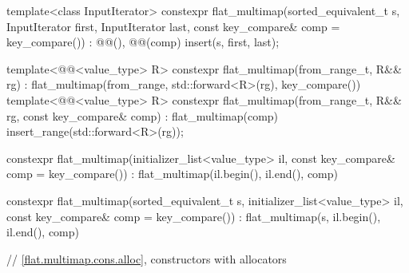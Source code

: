 \begin{codeblock}
{{    template<class InputIterator>
      constexpr flat_multimap(sorted_equivalent_t s, InputIterator first, InputIterator last,
                              const key_compare& comp = key_compare())
        : @@(), @@(comp) { insert(s, first, last); }

    template<@@<value_type> R>
      constexpr flat_multimap(from_range_t, R&& rg)
        : flat_multimap(from_range, std::forward<R>(rg), key_compare()) { }
    template<@@<value_type> R>
      constexpr flat_multimap(from_range_t, R&& rg, const key_compare& comp)
        : flat_multimap(comp) { insert_range(std::forward<R>(rg)); }

    constexpr flat_multimap(initializer_list<value_type> il,
                            const key_compare& comp = key_compare())
        : flat_multimap(il.begin(), il.end(), comp) { }

    constexpr flat_multimap(sorted_equivalent_t s, initializer_list<value_type> il,
                            const key_compare& comp = key_compare())
        : flat_multimap(s, il.begin(), il.end(), comp) { }

    // \ref{flat.multimap.cons.alloc}, constructors with allocators

}}
\end{codeblock}
